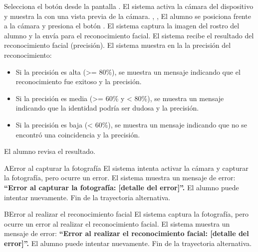 \begin{UCtrayectoria}
	\UCpaso[\UCactor] Selecciona el botón  desde la pantalla .
	\UCpaso El sistema activa la cámara del dispositivo y muestra la  con una vista previa de la cámara. , , 
	\UCpaso[\UCactor] El alumno se posiciona frente a la cámara y presiona el botón .
	\UCpaso El sistema captura la imagen del rostro del alumno y la envía para el reconocimiento facial.
	\UCpaso El sistema recibe el resultado del reconocimiento facial (precisión).
	\UCpaso El sistema muestra en la  la precisión del reconocimiento:
	\begin{itemize}
		\item Si la precisión es alta (>= 80\%), se muestra un mensaje indicando que el reconocimiento fue exitoso y la precisión. 
		\item Si la precisión es media (>= 60\% y < 80\%), se muestra un mensaje indicando que la identidad podría ser dudosa y la precisión.
		\item Si la precisión es baja (< 60\%), se muestra un mensaje indicando que no se encontró una coincidencia y la precisión.
	\end{itemize}
	\UCpaso[\UCactor] El alumno revisa el resultado.
\end{UCtrayectoria}
\begin{UCtrayectoriaA}{A}{Error al capturar la fotografía}
	\UCpaso El sistema intenta activar la cámara y capturar la fotografía, pero ocurre un error.
	\UCpaso El sistema muestra un mensaje de error: \textbf{``Error al capturar la fotografía: [detalle del error]''.}
	\UCpaso[\UCactor] El alumno puede intentar nuevamente.
	\UCpaso Fin de la trayectoria alternativa.
\end{UCtrayectoriaA}
\begin{UCtrayectoriaA}{B}{Error al realizar el reconocimiento facial}
	\UCpaso El sistema captura la fotografía, pero ocurre un error al realizar el reconocimiento facial.
	\UCpaso El sistema muestra un mensaje de error: \textbf{ ``Error al realizar el reconocimiento facial: [detalle del error]''.}
	\UCpaso[\UCactor] El alumno puede intentar nuevamente.
	\UCpaso Fin de la trayectoria alternativa.
\end{UCtrayectoriaA}
